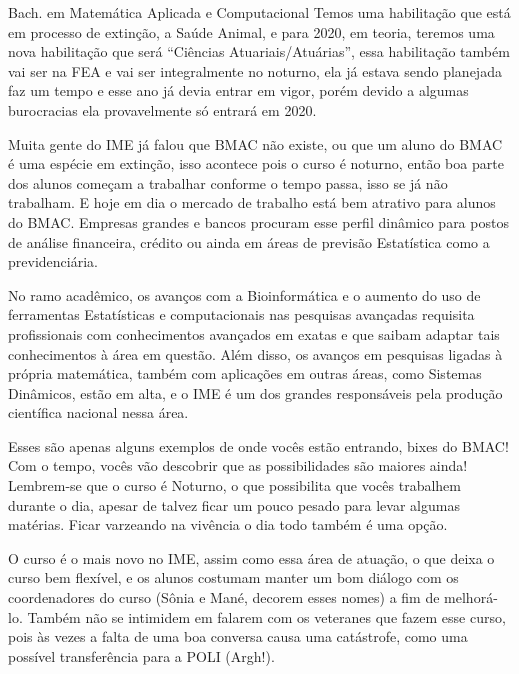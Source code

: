 \begin{subsecao}{Bach. em Matemática Aplicada e Computacional}
Temos uma habilitação que está em processo de extinção, a Saúde Animal, e para
2020, em teoria, teremos uma nova habilitação que será “Ciências Atuariais/Atuárias”, essa
habilitação também vai ser na FEA e vai ser integralmente no noturno, ela já
estava sendo planejada faz um tempo e esse ano já devia entrar em vigor, porém
devido a algumas burocracias ela provavelmente só entrará em 2020.

Muita gente do IME já falou que BMAC não existe, ou que um aluno do BMAC é uma
espécie em extinção, isso acontece pois o curso é noturno, então boa parte
dos alunos começam a trabalhar conforme o tempo passa, isso se já não trabalham.
E hoje em dia o mercado de trabalho está bem atrativo para alunos do BMAC.
Empresas grandes e bancos procuram esse perfil dinâmico para postos de análise
financeira, crédito ou ainda em áreas de previsão Estatística como a
previdenciária.

No ramo acadêmico, os avanços com a Bioinformática e o aumento do uso de
ferramentas Estatísticas e computacionais nas pesquisas avançadas requisita
profissionais com conhecimentos avançados em exatas e que saibam adaptar tais
conhecimentos à área em questão. Além disso, os avanços em pesquisas ligadas à
própria matemática, também com aplicações em outras áreas, como Sistemas
Dinâmicos, estão em alta, e o IME é um dos grandes responsáveis pela produção
científica nacional nessa área.

Esses são apenas alguns exemplos de onde vocês estão entrando, bixes do BMAC! Com o tempo,
vocês vão descobrir que as possibilidades são maiores ainda! Lembrem-se que o
curso é Noturno, o que possibilita que vocês trabalhem durante o dia, apesar de talvez
ficar um pouco pesado para levar algumas matérias. Ficar varzeando na vivência o dia todo
também é uma opção.

O curso é o mais novo no IME, assim como essa área de atuação, o que
deixa o curso bem flexível, e os alunos costumam manter um bom diálogo
com os coordenadores do curso (Sônia e Mané, decorem esses nomes) a fim de melhorá-lo.
Também não se intimidem em falarem com os veteranes que fazem esse curso, pois às
vezes a falta de uma boa conversa causa uma catástrofe, como uma possível
transferência para a POLI (Argh!).

\end{subsecao}
